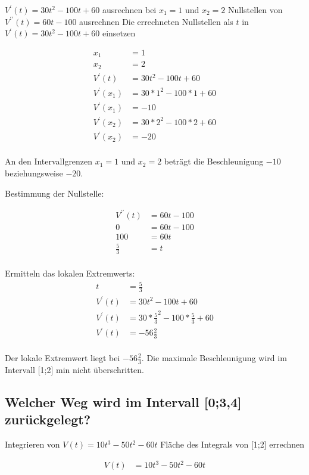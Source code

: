 \documentclass[a4paper,11pt]{scrartcl}
\begin{document}
\begin{outline}
  \1 $V^\prime(t) = 30t^2 - 100t + 60$ ausrechnen bei $x_1 = 1$ und $x_2 = 2$
  \1 Nullstellen von $V^{\prime\prime}(t) = 60t - 100$ ausrechnen
  \1 Die errechneten Nullstellen als $t$ in $V^\prime(t) = 30t^2 - 100t + 60$ einsetzen
\end{outline}

\begin{align*}
  x_1 &= 1                                  \\
  x_2 &= 2                                  \\
  V^\prime(t) &= 30t^2 - 100t + 60          \\
  V^\prime(x_1) &= 30 * 1^2 - 100 * 1 + 60  \\
  V^\prime(x_1) &= -10                      \\
  V^\prime(x_2) &= 30 * 2^2 - 100 * 2 + 60  \\
  V^\prime(x_2) &= -20                      \\
\end{align*}

An den Intervallgrenzen $x_1 = 1$ und $x_2 = 2$ beträgt die Beschleunigung $-10$ beziehungsweise $-20$.

Bestimmung der Nullstelle:

\begin{align*}
  V^{\prime\prime}(t) &= 60t - 100  \\
  0 &= 60t - 100                    \\
  100 &= 60t                        \\
  \frac{5}{3} &= t                  \\
\end{align*}

Ermitteln das lokalen Extremwerts:
\begin{align*}
  t &= \frac{5}{3}                                            \\
  V^\prime(t) &= 30t^2 - 100t + 60                            \\
  V^\prime(t) &= 30 * \frac{5}{3}^2 - 100 * \frac{5}{3} + 60  \\
  V^\prime(t) &= -56\frac{2}{3}                               \\
\end{align*}

Der lokale Extremwert liegt bei $-56\frac{2}{3}$. Die maximale Beschleunigung
wird im Intervall [1;2] min nicht überschritten.

\subsection{Welcher Weg wird im Intervall [0;3,4] zurückgelegt?}

\begin{outline}
  \1 Integrieren von $V(t) = 10t^3 - 50t^2 - 60t$
  \1 Fläche des Integrals von [1;2] errechnen
\end{outline}

\begin{align*}
  V(t) &= 10t^3 - 50t^2 - 60t
\end{align*}
\end{document}

